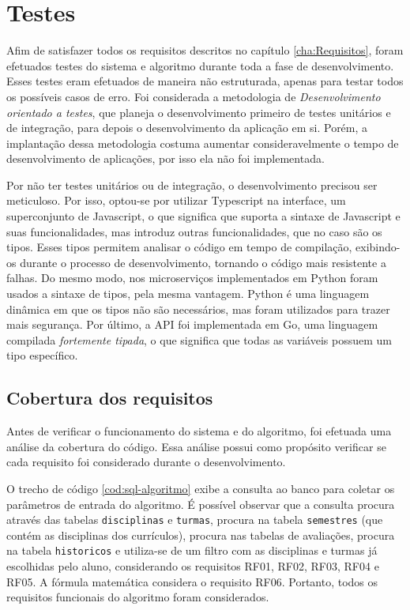 \chapter{Testes}
\label{cha:Testes}

Afim de satisfazer todos os requisitos descritos no capítulo \ref{cha:Requisitos}, foram efetuados testes do sistema e algoritmo durante toda a fase de desenvolvimento. Esses testes eram efetuados de maneira não estruturada, apenas para testar todos os possíveis casos de erro. Foi considerada a metodologia de \textit{Desenvolvimento orientado a testes}, que planeja o desenvolvimento primeiro de testes unitários e de integração, para depois o desenvolvimento da aplicação em si. Porém, a implantação dessa metodologia costuma aumentar consideravelmente o tempo de desenvolvimento de aplicações, por isso ela não foi implementada.

Por não ter testes unitários ou de integração, o desenvolvimento precisou ser meticuloso. Por isso, optou-se por utilizar Typescript na interface, um superconjunto de Javascript, o que significa que suporta a sintaxe de Javascript e suas funcionalidades, mas introduz outras funcionalidades, que no caso são os tipos. Esses tipos permitem analisar o código em tempo de compilação, exibindo-os durante o processo de desenvolvimento, tornando o código mais resistente a falhas. Do mesmo modo, nos microserviços implementados em Python foram usados a sintaxe de tipos, pela mesma vantagem. Python é uma linguagem dinâmica em que os tipos não são necessários, mas foram utilizados para trazer mais segurança. Por último, a API foi implementada em Go, uma linguagem compilada \textit{fortemente tipada}, o que significa que todas as variáveis possuem um tipo específico.

\section{Cobertura dos requisitos}
\label{sec:Cobertura dos requisitos}

Antes de verificar o funcionamento do sistema e do algoritmo, foi efetuada uma análise da cobertura do código. Essa análise possui como propósito verificar se cada requisito foi considerado durante o desenvolvimento. 

O trecho de código \ref{cod:sql-algoritmo} exibe a consulta ao banco para coletar os parâmetros de entrada do algoritmo. É possível observar que a consulta procura através das tabelas \verb|disciplinas| e \verb|turmas|, procura na tabela \verb|semestres| (que contém as disciplinas dos currículos), procura nas tabelas de avaliações, procura na tabela \verb|historicos| e utiliza-se de um filtro com as disciplinas e turmas já escolhidas pelo aluno, considerando os requisitos RF01, RF02, RF03, RF04 e RF05. A fórmula matemática considera o requisito RF06. Portanto, todos os requisitos funcionais do algoritmo foram considerados. 

